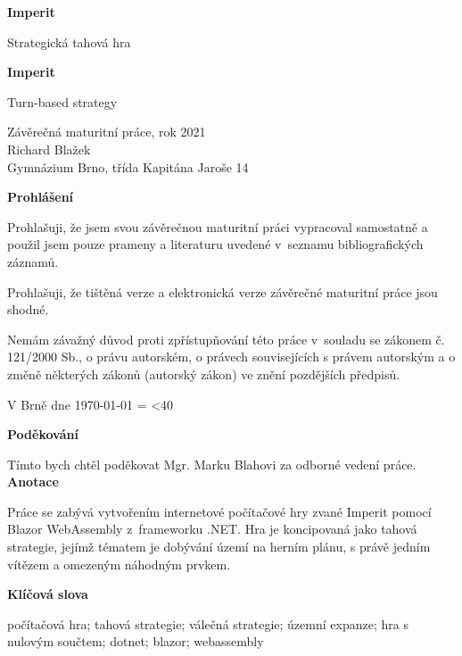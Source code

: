 \documentclass[a4paper,12pt]{article}
\author{Richard Blažek}
\makeatletter
\newcommand{\repeatchar}[2]{%
  \begingroup
  \my@repeat@count=\z@
  \@whilenum\my@repeat@count<#1\do{#2\advance\my@repeat@count\@ne}%
  \endgroup
}
\makeatother
\begin{document}
\begin{titlepage}
    \begin{center}

	\vspace*{3cm}            
	\Huge
	\textbf{Imperit}
            
	\vspace{0.5cm}
	\LARGE
	Strategická tahová hra
        
	\vspace*{1cm}
	\Huge
	\textbf{Imperit}
            
	\vspace{0.5cm}
	\LARGE
	Turn-based strategy
            
	\vfill
            
	\large
        Závěrečná maturitní práce, rok 2021\\
	Richard Blažek\\
	Gymnázium Brno, třída Kapitána Jaroše 14
    \end{center}
\end{titlepage}
\thispagestyle{empty}
\Large\textbf{Prohlášení}\normalsize

Prohlašuji, že jsem svou závěrečnou maturitní práci vypracoval samostatně a použil jsem pouze prameny a literaturu uvedené v~seznamu bibliografických záznamů.

Prohlašuji, že tištěná verze a elektronická verze závěrečné maturitní práce jsou shodné.

Nemám závažný důvod proti zpřístupňování této práce v~souladu se zákonem č. 121/2000 Sb., o právu autorském, o právech souvisejících s právem autorským a o změně některých zákonů (autorský zákon) ve znění pozdějších předpisů. 

V Brně dne \today{} \repeatchar{40}{.}
\newpage
\thispagestyle{empty}
\Large\textbf{Poděkování}\normalsize

Tímto bych chtěl poděkovat Mgr. Marku Blahovi za odborné vedení práce.
\newpage
\thispagestyle{empty}
\Large\textbf{Anotace}\normalsize

Práce se zabývá vytvořením internetové počítačové hry zvané Imperit pomocí Blazor WebAssembly z~frameworku .NET. Hra je koncipovaná jako tahová strategie, jejímž tématem je dobývání území na herním plánu, s právě jedním vítězem a omezeným náhodným prvkem.

\Large\textbf{Klíčová slova}\normalsize

počítačová hra; tahová strategie; válečná strategie; územní expanze; hra s nulovým součtem;\- dotnet; blazor; webassembly
\end{document}

